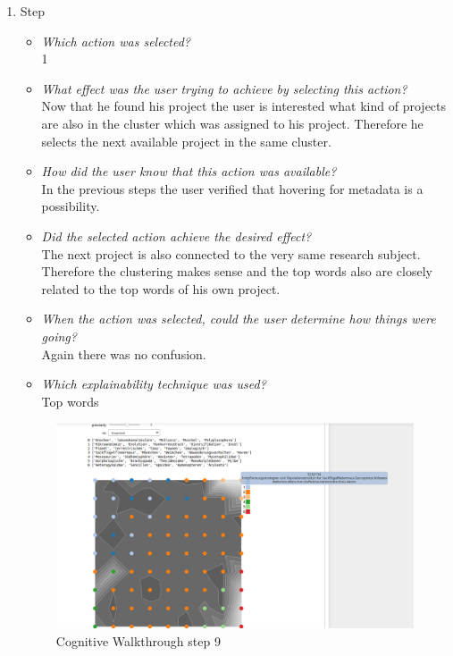 {\begin{enumerate}
		\item Step
		\begin{itemize}
			\item \textit{Which action was selected?} \\
			1
			\item \textit{What effect was the user trying to achieve by selecting this action?} \\
			Now that he found his project the user is interested what kind of projects are also in the cluster which was assigned to his project. Therefore he selects the next available project in the same cluster. 
			\item \textit{How did the user know that this action was available?} \\
			In the previous steps the user verified that hovering for metadata is a possibility. 
			\item \textit{Did the selected action achieve the desired effect?} \\
			The next project is also connected to the very same research subject. Therefore the clustering makes sense and the top words also are closely related to the top words of his own project. 
			\item \textit{When the action was selected, could the user determine how things were going?} \\
			Again there was no confusion.
			\item \textit{Which explainability technique was used?}\\
			Top words
		\end{itemize}
		\begin{figure}[H]
			\centering
			\includegraphics[width=400px]{../chapters/validation/pics/7_c}
			\caption{\label{pic:step9} Cognitive Walkthrough step 9}
		\end{figure} \newpage
		

\end{enumerate}}
